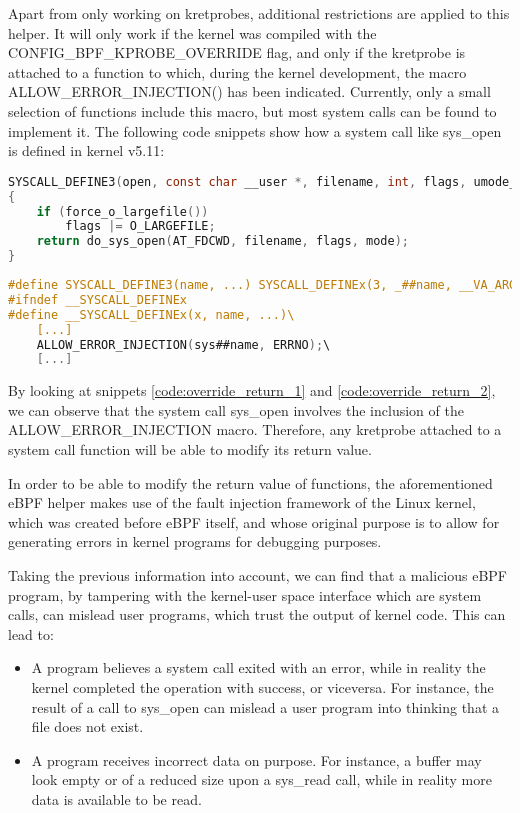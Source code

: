Apart from only working on kretprobes, additional restrictions are applied to this helper. It will only work if the kernel was compiled with the CONFIG\_BPF\_KPROBE\_OVERRIDE flag, and only if the kretprobe is attached to a function to which, during the kernel development, the macro ALLOW\_ERROR\_INJECTION() has been indicated. Currently, only a small selection of functions include this macro, but most system calls can be found to implement it. The following code snippets show how a system call like sys\_open is defined in kernel v5.11:

\begin{lstlisting}[language=C, caption={Definition of the syscall sys\_open in the kernel \cite{code_kernel_open}}, label={code:override_return_1}]
SYSCALL_DEFINE3(open, const char __user *, filename, int, flags, umode_t, mode)
{
	if (force_o_largefile())
		flags |= O_LARGEFILE;
	return do_sys_open(AT_FDCWD, filename, flags, mode);
}
\end{lstlisting}

\begin{lstlisting}[language=C, caption={Definition of the macro for creating syscalls, containing the error injection macro. Only relevant instructions included, complete macro can be found in the kernel \cite{code_kernel_syscall}}, label={code:override_return_2}]
#define SYSCALL_DEFINE3(name, ...) SYSCALL_DEFINEx(3, _##name, __VA_ARGS__)
#ifndef __SYSCALL_DEFINEx
#define __SYSCALL_DEFINEx(x, name, ...)\
	[...]
	ALLOW_ERROR_INJECTION(sys##name, ERRNO);\
	[...]
\end{lstlisting}


By looking at snippets \ref{code:override_return_1} and \ref{code:override_return_2}, we can observe that the system call sys\_open involves the inclusion of the ALLOW\_ERROR\_INJECTION macro. Therefore, any kretprobe attached to a system call function will be able to modify its return value.

In order to be able to modify the return value of functions, the aforementioned eBPF helper makes use of the fault injection framework of the Linux kernel\cite{fault_injection}, which was created before eBPF itself, and whose original purpose is to allow for generating errors in kernel programs for debugging purposes.

Taking the previous information into account, we can find that a malicious eBPF program, by tampering with the kernel-user space interface which are system calls, can mislead user programs, which trust the output of kernel code. This can lead to:
\begin{itemize}
\item A program believes a system call exited with an error, while in reality the kernel completed the operation with success, or viceversa. For instance, the result of a call to sys\_open can mislead a user program into thinking that a file does not exist.
\item A program receives incorrect data on purpose. For instance, a buffer may look empty or of a reduced size upon a sys\_read call, while in reality more data is available to be read.
\end{itemize}

